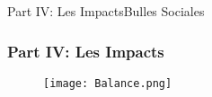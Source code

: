 \begin{frame}{Part IV: Les Impacts}{Bulles Sociales}

    \begin{figure}
        \centering
    \end{figure}

\end{frame}

\begin{frame}
    \frametitle{Part IV: Les Impacts}

    \begin{figure}
        \centering
        \texttt{[image: Balance.png]}
    \end{figure}

\end{frame}